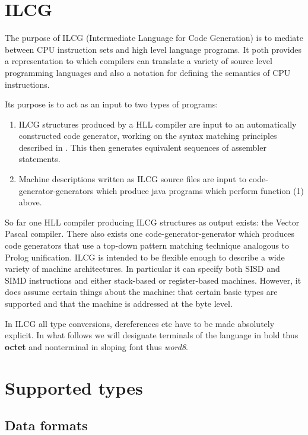 {{\section{ILCG }

\label{ilcgintro} The purpose of ILCG (Intermediate Language for
Code Generation) is to mediate between CPU instruction sets and high
level language programs. It poth provides a representation to which
compilers can translate a variety of source level programming languages
and also a notation for defining the semantics of CPU instructions.

Its purpose is to act as an input to two types of programs: 

\begin{enumerate}
\item ILCG structures produced by a HLL compiler are input to an automatically
constructed code generator, working on the syntax matching principles
described in \cite{graham80}. This then generates equivalent sequences
of assembler statements. 
\item Machine descriptions written as ILCG source files are input to code-generator-generators
which produce java programs which perform function (1) above. 
\end{enumerate}
So far one HLL compiler producing ILCG structures as output exists:
the Vector Pascal compiler. There also exists one code-generator-generator
which produces code generators that use a top-down pattern matching
technique analogous to Prolog unification. ILCG is intended to be
flexible enough to describe a wide variety of machine architectures.
In particular it can specify both SISD and SIMD instructions and either
stack-based or register-based machines. However, it does assume certain
things about the machine: that certain basic types are supported and
that the machine is addressed at the byte level.

In ILCG all type conversions, dereferences etc have to be made absolutely
explicit. In what follows we will designate terminals of the language
in bold thus \textbf{octet} and nonterminal in sloping font thus 
\textsl{word8}. 


\section{Supported types}


\subsection{Data formats}

}}
